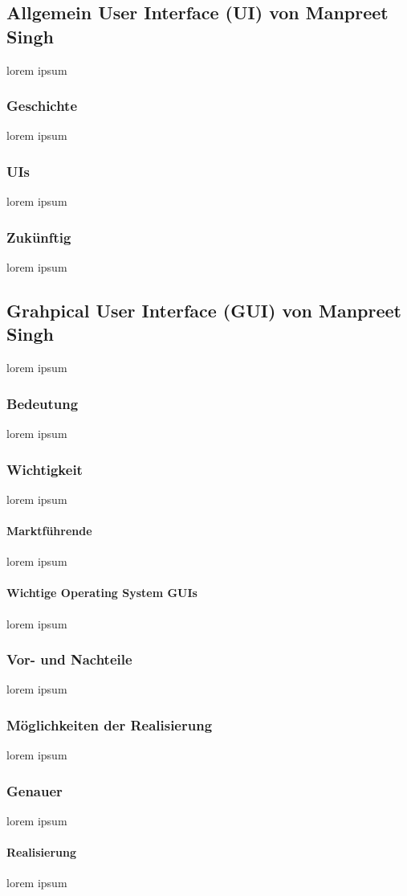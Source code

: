 \documentclass[12pt,a4paper]{report}
\begin{document}
\subsection{Allgemein User Interface (UI) von Manpreet Singh}
lorem ipsum
\subsubsection{Geschichte}
lorem ipsum
\subsubsection{UIs}
lorem ipsum 
\subsubsection{Zukünftig}
lorem ipsum 
\subsection{Grahpical User Interface (GUI) von Manpreet Singh}
lorem ipsum
\subsubsection{Bedeutung}
lorem ipsum
\subsubsection{Wichtigkeit}
lorem ipsum
\paragraph{Marktführende}
lorem ipsum
\paragraph{Wichtige Operating System GUIs}
lorem ipsum
\subsubsection{Vor- und Nachteile}
lorem ipsum
\subsubsection{Möglichkeiten der Realisierung}
lorem ipsum
\subsubsection{Genauer}
lorem ipsum
\paragraph{Realisierung}
lorem ipsum
\end{document}

